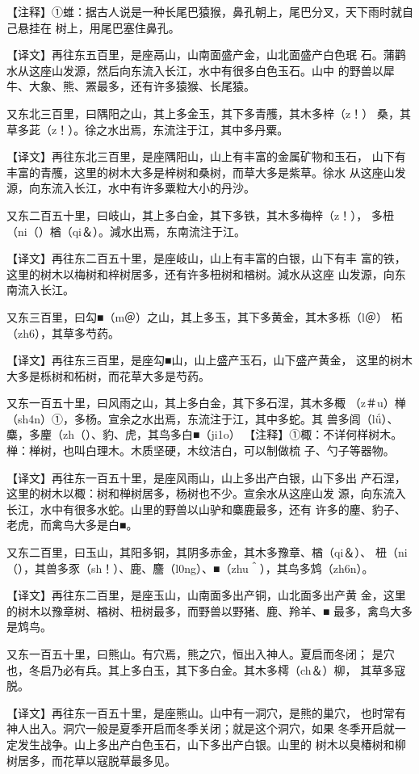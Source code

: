 \documentclass[a4paper,12pt,UTF8,twoside]{ctexbook}
\begin{document}
【注释】①蜼：据古人说是一种长尾巴猿猴，鼻孔朝上，尾巴分叉，天下雨时就自己悬挂在 树上，用尾巴塞住鼻孔。

【译文】再往东五百里，是座鬲山，山南面盛产金，山北面盛产白色珉 石。蒲鹳水从这座山发源，然后向东流入长江，水中有很多白色玉石。山中 的野兽以犀牛、大象、熊、罴最多，还有许多猿猴、长尾猿。

又东北三百里，曰隅阳之山，其上多金玉，其下多青雘，其木多梓（z！） 桑，其草多茈（z！）。徐之水出焉，东流注于江，其中多丹粟。

【译文】再往东北三百里，是座隅阳山，山上有丰富的金属矿物和玉石， 山下有丰富的青雘，这里的树木大多是梓树和桑树，而草大多是紫草。徐水 从这座山发源，向东流入长江，水中有许多粟粒大小的丹沙。

又东二百五十里，曰岐山，其上多白金，其下多铁，其木多梅梓（z！）， 多杻（ni（）楢（qi＆）。減水出焉，东南流注于江。

【译文】再往东二百五十里，是座岐山，山上有丰富的白银，山下有丰 富的铁，这里的树木以梅树和梓树居多，还有许多杻树和楢树。減水从这座 山发源，向东南流入长江。

又东三百里，曰勾■（m＠）之山，其上多玉，其下多黄金，其木多栎（l＠） 柘（zh6），其草多芍药。

【译文】再往东三百里，是座勾■山，山上盛产玉石，山下盛产黄金， 这里的树木大多是栎树和柘树，而花草大多是芍药。

又东一百五十里，曰风雨之山，其上多白金，其下多石涅，其木多棷 （z＃u）椫（sh4n）①，多杨。宣余之水出焉，东流注于江，其中多蛇。其 兽多闾（lǘ）、麋，多麈（zh（）、豹、虎，其鸟多白■（ji1o）  【注释】①棷：不详何样树木。椫：椫树，也叫白理木。木质坚硬，木纹洁白，可以制做梳 子、勺子等器物。

【译文】再往东一百五十里，是座风雨山，山上多出产白银，山下多出 产石涅，这里的树木以棷：树和椫树居多，杨树也不少。宣余水从这座山发 源，向东流入长江，水中有很多水蛇。山里的野兽以山驴和麋鹿最多，还有 许多的麈、豹子、老虎，而禽鸟大多是白■。

又东二百里，曰玉山，其阳多铜，其阴多赤金，其木多豫章、楢（qi＆）、 杻（ni（），其兽多豕（sh！）、鹿、麢（l0ng）、■（zhu＾），其鸟多鸩（zh6n）。

【译文】再往东二百里，是座玉山，山南面多出产铜，山北面多出产黄 金，这里的树木以豫章树、楢树、杻树最多，而野兽以野猪、鹿、羚羊、■ 最多，禽鸟大多是鸩鸟。

又东一百五十里，曰熊山。有穴焉，熊之穴，恒出入神人。夏启而冬闭； 是穴也，冬启乃必有兵。其上多白玉，其下多白金。其木多樗（ch＆）柳， 其草多寇脱。

【译文】再往东一百五十里，是座熊山。山中有一洞穴，是熊的巢穴， 也时常有神人出入。洞穴一般是夏季开启而冬季关闭；就是这个洞穴，如果 冬季开启就一定发生战争。山上多出产白色玉石，山下多出产白银。山里的 树木以臭椿树和柳树居多，而花草以寇脱草最多见。
\end{document}
